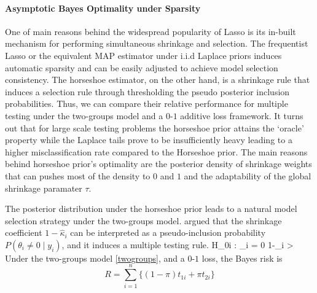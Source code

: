 \documentclass[11pt]{article}
\numberwithin{equation}{section}
\begin{document}

\paragraph{Asymptotic Bayes Optimality under Sparsity}

One of main reasons behind the widespread popularity of Lasso is its in-built mechanism for performing simultaneous shrinkage and selection. The frequentist Lasso or the equivalent MAP estimator under i.i.d Laplace priors induces automatic sparsity and can be easily adjusted to achieve model selection consistency. The horseshoe estimator, on the other hand, is a shrinkage rule that induces a selection rule through thresholding the pseudo posterior inclusion probabilities. Thus, we can compare their relative performance for multiple testing under the two-groups model and a $0$-$1$ additive loss framework. It turns out that for large scale testing problems the horseshoe prior attains the `oracle' property while the Laplace tails prove to be insufficiently heavy leading to a higher misclassification rate compared to the Horseshoe prior. The main reasons behind horseshoe prior's optimality are the posterior density of shrinkage weights that can pushes most of the density to $0$ and $1$ and the adaptability of the global shrinkage paramater $\tau$. 

The posterior distribution under the horseshoe prior leads to a natural model selection strategy under the two-groups model. \citet{carvalho2010horseshoe} argued that the shrinkage coefficient $1-\hat{\kappa}_i$ can be interpreted as a pseudo-inclusion probability $P(\theta_i \ne 0 \mid y_i)$, and it induces a multiple testing rule.
\beq
{} H_{0i} : \theta_i = 0  1-\hat{\kappa}_i > \half \label{eq:hsrule}
\eeq
Under the two-groups model \eqref{twogroups}, and a $0$-$1$ loss, the Bayes risk is 
\[
R = \sum_{i=1}^{n} \{ (1- \pi) t_{1i} + \pi t_{2i} \}
\]
\end{document}
